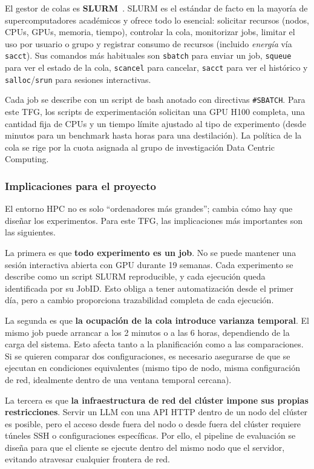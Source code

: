 El gestor de colas es \textbf{SLURM}~\cite{slurm}. SLURM es el estándar de facto en la mayoría de supercomputadores académicos y ofrece todo lo esencial: solicitar recursos (nodos, CPUs, GPUs, memoria, tiempo), controlar la cola, monitorizar jobs, limitar el uso por usuario o grupo y registrar consumo de recursos (incluido \textit{energía} vía \texttt{sacct}). Sus comandos más habituales son \texttt{sbatch} para enviar un job, \texttt{squeue} para ver el estado de la cola, \texttt{scancel} para cancelar, \texttt{sacct} para ver el histórico y \texttt{salloc}/\texttt{srun} para sesiones interactivas.

Cada job se describe con un script de bash anotado con directivas \texttt{\#SBATCH}. Para este TFG, los scripts de experimentación solicitan una GPU H100 completa, una cantidad fija de CPUs y un tiempo límite ajustado al tipo de experimento (desde minutos para un benchmark hasta horas para una destilación). La política de la cola se rige por la cuota asignada al grupo de investigación Data Centric Computing.

\subsubsection{Implicaciones para el proyecto}

El entorno HPC no es solo ``ordenadores más grandes''; cambia cómo hay que diseñar los experimentos. Para este TFG, las implicaciones más importantes son las siguientes.

La primera es que \textbf{todo experimento es un job}. No se puede mantener una sesión interactiva abierta con GPU durante 19 semanas. Cada experimento se describe como un script SLURM reproducible, y cada ejecución queda identificada por su JobID. Esto obliga a tener automatización desde el primer día, pero a cambio proporciona trazabilidad completa de cada ejecución.

La segunda es que \textbf{la ocupación de la cola introduce varianza temporal}. El mismo job puede arrancar a los 2 minutos o a las 6 horas, dependiendo de la carga del sistema. Esto afecta tanto a la planificación como a las comparaciones. Si se quieren comparar dos configuraciones, es necesario asegurarse de que se ejecutan en condiciones equivalentes (mismo tipo de nodo, misma configuración de red, idealmente dentro de una ventana temporal cercana).

La tercera es que \textbf{la infraestructura de red del clúster impone sus propias restricciones}. Servir un LLM con una API HTTP dentro de un nodo del clúster es posible, pero el acceso desde fuera del nodo o desde fuera del clúster requiere túneles SSH o configuraciones específicas. Por ello, el pipeline de evaluación se diseña para que el cliente se ejecute dentro del mismo nodo que el servidor, evitando atravesar cualquier frontera de red.

